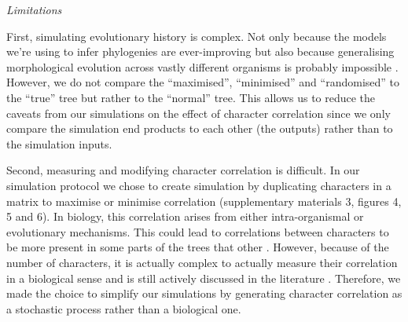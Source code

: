 \documentclass[12pt,letterpaper]{article}
\renewcommand{\subsection}[1]{%
\bigskip
\begin{center}
\begin{large}
\normalfont\itshape #1
\end{large}
\end{center}}
\begin{document}
\subsection{Limitations}
First, simulating evolutionary history is complex.
Not only because the models we're using to infer phylogenies are ever-improving \citep[e.g.][]{heath2014fossilized,Wright01072016} but also because generalising morphological evolution across vastly different organisms is probably impossible \citep[see constrasted discussions from][]{GoloboffEmpirical,OReillyEmpirical}.
However, we do not compare the ``maximised'', ``minimised'' and ``randomised'' to the ``true'' tree but rather to the ``normal'' tree.
This allows us to reduce the caveats from our simulations on the effect of character correlation since we only compare the simulation end products to each other (the outputs) rather than to the simulation inputs.
 
Second, measuring and modifying character correlation is difficult. 
In our simulation protocol we chose to create simulation by duplicating characters in a matrix to maximise or minimise correlation (supplementary materials 3, figures 4, 5 and 6).
In biology, this correlation arises from either intra-organismal or evolutionary mechanisms.
This could lead to correlations between characters to be more present in some parts of the trees that other \citep[e.g. in the case of inapplicable data ][]{BrazeauNA}.
However, because of the number of characters, it is actually complex to actually measure their correlation in a biological sense and is still actively discussed in the literature \citep{Lande1983,Maddison1990,Pagel1994,Pagel2006,goswami2006morphological,goswami2010,goswami2014macroevolutionary,Grabowski2016}.
Therefore, we made the choice to simplify our simulations by generating character correlation as a stochastic process rather than a biological one.
\end{document}

